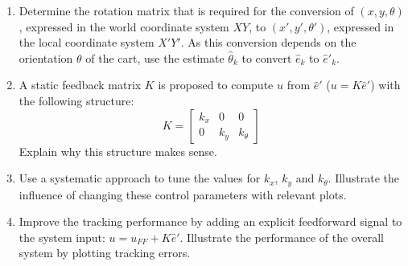 \documentclass[10pt,a4paper]{article}
\begin{document}
\begin{enumerate}
  \begin{enumerate}
    \item Determine the rotation matrix that is required for the conversion of $(x,y,\theta)$, expressed in the world coordinate system $XY$, to $(x',y',\theta')$, expressed in the local coordinate system $X'Y'$. As this conversion depends on the orientation $\theta$ of the cart, use the estimate $\hat{\theta}_k$ to convert $\hat{e}_k$ to $\hat{e}'_k$.
    \item A static feedback matrix $K$ is proposed to compute $u$ from $\hat{e}'$ ($u = K \hat{e}'$) with the following structure:
    \begin{equation}
      K = \begin{bmatrix} k_x & 0 & 0 \\ 0 & k_y & k_\theta \end{bmatrix}\,
    \end{equation}
    Explain why this structure makes sense.
    \item Use a systematic approach to tune the values for $k_x$, $k_y$ and $k_\theta$. Illustrate the influence of changing these control parameters with relevant plots.
    \item Improve the tracking performance by adding an explicit feedforward signal to the system input: ${u=u_{FF}+K\hat{e}'}$. Illustrate the performance of the overall system by plotting tracking errors.
  \end{enumerate}
\end{enumerate}
\end{document}
